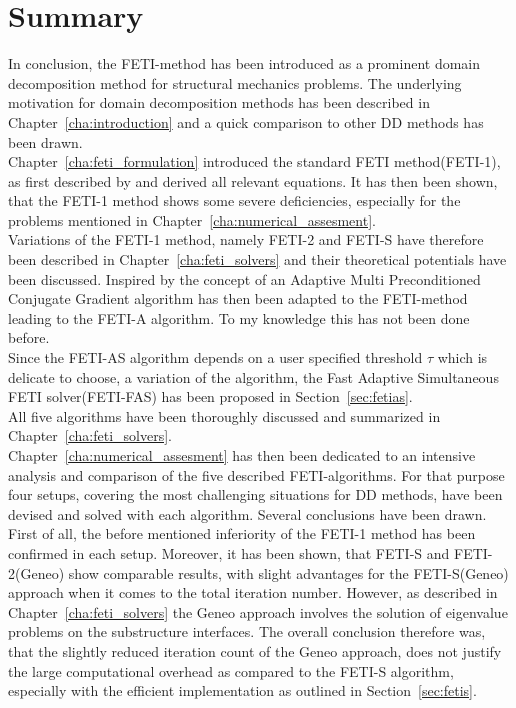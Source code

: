 \chapter{Summary}\label{cha:summary}

In conclusion, the FETI-method has been introduced as a prominent domain decomposition method for structural mechanics problems. The underlying motivation for domain decomposition methods has been described in Chapter~\ref{cha:introduction} and a quick comparison to other DD methods has been drawn.\\
Chapter~\ref{cha:feti_formulation} introduced the standard FETI method(FETI-1), as first described by \cite{Farhat1991} and derived all relevant equations. It has then been shown, that the FETI-1 method shows some severe deficiencies, especially for the problems mentioned in Chapter~\ref{cha:numerical_assesment}.\\
Variations of the FETI-1 method, namely FETI-2 and FETI-S have therefore been described in Chapter~\ref{cha:feti_solvers} and their theoretical potentials have been discussed.
Inspired by\cite{Spillane2016} the concept of an Adaptive Multi Preconditioned Conjugate Gradient algorithm has then been adapted to the FETI-method leading to the FETI-A algorithm. To my knowledge this has not been done before.\\
Since the FETI-AS algorithm depends on a user specified threshold $\tau$ which is delicate to choose, a variation of the algorithm, the Fast Adaptive Simultaneous FETI solver(FETI-FAS) has been proposed in Section~\ref{sec:fetias}.\\
All five algorithms have been thoroughly discussed and summarized in Chapter~\ref{cha:feti_solvers}.\\
Chapter~\ref{cha:numerical_assesment} has then been dedicated to an intensive analysis and comparison of the five described FETI-algorithms. For that purpose four setups, covering the most challenging situations for DD methods, have been devised and solved with each algorithm. Several conclusions have been drawn.\\
First of all, the before mentioned inferiority of the FETI-1 method has been confirmed in each setup. Moreover, it has been shown, that FETI-S and FETI-2(Geneo) show comparable results, with slight advantages for the FETI-S(Geneo) approach when it comes to the total iteration number. However, as described in Chapter~\ref{cha:feti_solvers} the Geneo approach involves the solution of eigenvalue problems on the substructure interfaces. The overall conclusion therefore was, that the slightly reduced iteration count of the Geneo approach, does not justify the large computational overhead as compared to the FETI-S algorithm, especially with the efficient implementation as outlined in Section~\ref{sec:fetis}.\\

